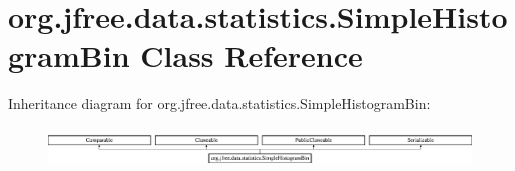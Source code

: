 \hypertarget{classorg_1_1jfree_1_1data_1_1statistics_1_1_simple_histogram_bin}{}\section{org.\+jfree.\+data.\+statistics.\+Simple\+Histogram\+Bin Class Reference}
\label{classorg_1_1jfree_1_1data_1_1statistics_1_1_simple_histogram_bin}
Inheritance diagram for org.\+jfree.\+data.\+statistics.\+Simple\+Histogram\+Bin\+:\begin{figure}[H]
\begin{center}
\leavevmode
\includegraphics[height=1.064639cm]{classorg_1_1jfree_1_1data_1_1statistics_1_1_simple_histogram_bin}
\end{center}
\end{figure}
